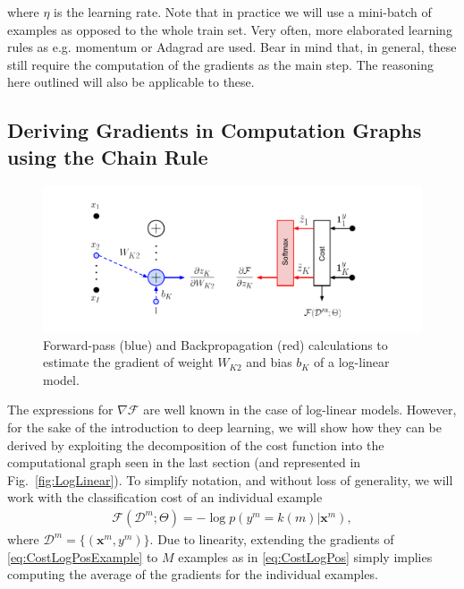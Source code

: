 \noindent where $\eta$ is the learning rate. Note that in practice we will use
a mini-batch of examples as opposed to the whole train set. Very often, more
elaborated learning rules as e.g. momentum or Adagrad are used. Bear in mind
that, in general, these still require the computation of the gradients as the
main step. The reasoning here outlined will also be applicable to these.  

\subsection{Deriving Gradients in Computation Graphs using the Chain Rule}

\begin{figure}[!h]
\centering
\includegraphics[scale=0.6]{figs/deep_learning/LogLin_color.pdf}
\caption{Forward-pass (blue) and Backpropagation (red) calculations to estimate the gradient of weight $W_{K2}$ and bias $b_K$ of a log-linear model.}
\label{fig:LogLinColor}
\end{figure}

The expressions for $\nabla\mathcal{F}$ are well known in the case of log-linear models. However, for
the sake of the introduction to deep learning, we will show how they can
be derived by exploiting the decomposition of the cost function into the computational
graph seen in the last section (and represented in Fig.~\ref{fig:LogLinear}). To simplify notation, and without loss of generality, we will work with the 
classification cost of an individual example 
%
\begin{align}
\mathcal{F}(\mathcal{D}^m;\Theta) 
= -\log p(y^m=k(m) | \mathbf{x}^m), 
\label{eq:CostLogPosExample}
\end{align}
%
where $\mathcal{D}^m=\{(\mathbf{x}^m, y^m)\}$. Due to linearity, extending the
gradients of \ref{eq:CostLogPosExample} to $M$ examples as in
\ref{eq:CostLogPos} simply implies computing the average of the gradients for
the individual examples.


